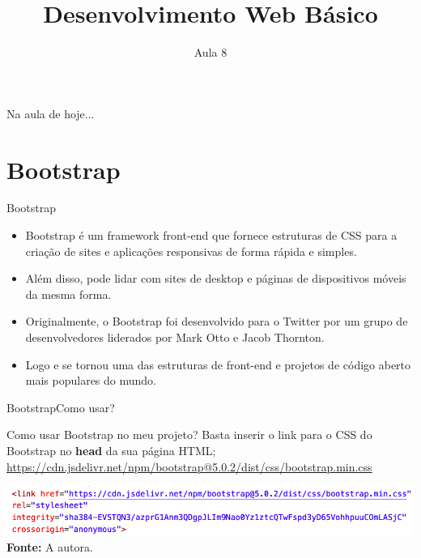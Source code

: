 \documentclass{beamer}
\title{Desenvolvimento Web Básico}
\subtitle{Aula 8}
\begin{document}
\frame{
 \titlepage
}

\begin{frame}{Na aula de hoje...} 
\tableofcontents 
\end{frame}
\section{Bootstrap}
\begin{frame}{Bootstrap}
  \begin{itemize}
      \item Bootstrap é um framework front-end que fornece estruturas de CSS para a criação de sites e aplicações responsivas de forma rápida e simples. 
      \item Além disso, pode lidar com sites de desktop e páginas de dispositivos móveis da mesma forma.
      \item Originalmente, o Bootstrap foi desenvolvido para o Twitter por um grupo de desenvolvedores liderados por Mark Otto e Jacob Thornton.
      \item Logo e se tornou uma das estruturas de front-end e projetos de código aberto mais populares do mundo.
  \end{itemize}
\end{frame}

\begin{frame}{Bootstrap}{Como usar?}
\begin{block}{Como usar Bootstrap no meu projeto?}
Basta inserir o link para o CSS do Bootstrap no \textbf{head} da sua página HTML;\vspace{0.3cm}
\textcolor{blue}{\href{https://cdn.jsdelivr.net/npm/bootstrap@5.0.2/dist/css/bootstrap.min.css}{https://cdn.jsdelivr.net/npm/bootstrap@5.0.2/dist/css/bootstrap.min.css}}
\end{block}
  \begin{center}
       \includegraphics[height=0.14\paperheight]{fig/aula6/aula6_1.png} \\
       \tiny{\textbf{Fonte: } A autora.}
      \end{center}
\end{frame}
\end{document}
